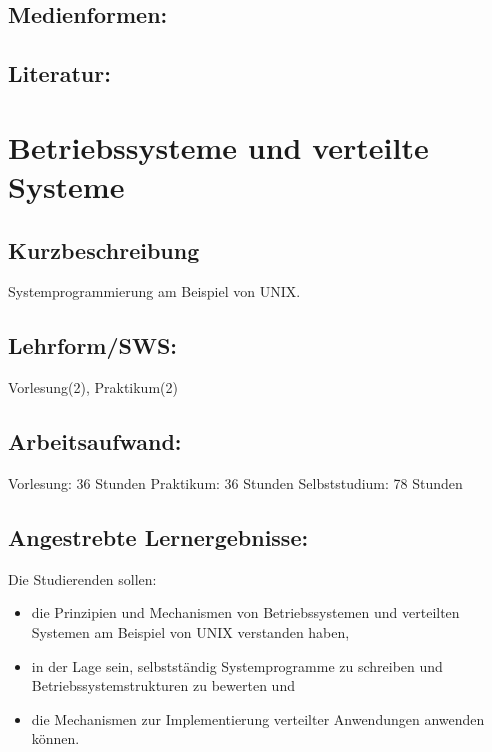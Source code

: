 \section{Medienformen:}\label{medienformen-4}

\section{Literatur:}\label{literatur-4}

\chapter{Betriebssysteme und verteilte
Systeme}\label{betriebssysteme-und-verteilte-systeme}

\section{Kurzbeschreibung}\label{kurzbeschreibung-1}

Systemprogrammierung am Beispiel von UNIX.

\section{Lehrform/SWS:}\label{lehrformsws-5}

Vorlesung(2), Praktikum(2)

\section{Arbeitsaufwand:}\label{arbeitsaufwand-5}

Vorlesung: 36 Stunden Praktikum: 36 Stunden Selbststudium: 78 Stunden

\section{Angestrebte
Lernergebnisse:}\label{angestrebte-lernergebnisse-5}

Die Studierenden sollen:

\begin{itemize}
\tightlist
\item
  die Prinzipien und Mechanismen von Betriebssystemen und verteilten
  Systemen am Beispiel von UNIX verstanden haben,
\item
  in der Lage sein, selbstständig Systemprogramme zu schreiben und
  Betriebssystemstrukturen zu bewerten und
\item
  die Mechanismen zur Implementierung verteilter Anwendungen anwenden
  können.
\end{itemize}


